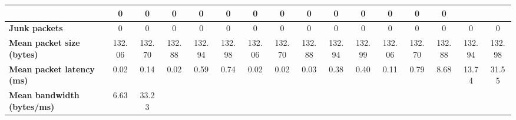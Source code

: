 \begin{table}[!h]
{\begin{tabular}{|l|ccccc|ccccc|ccccc|}
            & \multicolumn{1}{c|}{0}
            & \multicolumn{1}{c|}{0}
            & \multicolumn{1}{c|}{0}
            & \multicolumn{1}{c|}{0}
            & \multicolumn{1}{c|}{0}
            & \multicolumn{1}{c|}{0}
            & \multicolumn{1}{c|}{0}
            & \multicolumn{1}{c|}{0}
            & \multicolumn{1}{c|}{0}
            & \multicolumn{1}{c|}{0}
            & \multicolumn{1}{c|}{0}
            & \multicolumn{1}{c|}{0}
            & \multicolumn{1}{c|}{0}
            \\ \hline
            \textbf{Junk packets} & \multicolumn{1}{c|}{0} & \multicolumn{1}{c|}{0} & \multicolumn{1}{c|}{0}
            & \multicolumn{1}{c|}{0}
            & \multicolumn{1}{c|}{0}
            & \multicolumn{1}{c|}{0}
            & \multicolumn{1}{c|}{0}
            & \multicolumn{1}{c|}{0}
            & \multicolumn{1}{c|}{0}
            & \multicolumn{1}{c|}{0}
            & \multicolumn{1}{c|}{0}
            & \multicolumn{1}{c|}{0}
            & \multicolumn{1}{c|}{0}
            & \multicolumn{1}{c|}{0}
            & \multicolumn{1}{c|}{0}
            \\ \hline
            \textbf{Mean packet size (bytes)} & \multicolumn{1}{c|}{132.06} & \multicolumn{1}{c|}{132.70}
            & \multicolumn{1}{c|}{132.88}
            & \multicolumn{1}{c|}{132.94}
            & \multicolumn{1}{c|}{132.98}
            & \multicolumn{1}{c|}{132.06}
            & \multicolumn{1}{c|}{132.70}
            & \multicolumn{1}{c|}{132.88}
            & \multicolumn{1}{c|}{132.94}
            & \multicolumn{1}{c|}{132.99}
            & \multicolumn{1}{c|}{132.06}
            & \multicolumn{1}{c|}{132.70}
            & \multicolumn{1}{c|}{132.88}
            & \multicolumn{1}{c|}{132.94}
            & \multicolumn{1}{c|}{132.98}
            \\ \hline
            \textbf{Mean packet latency (ms)} & \multicolumn{1}{c|}{0.02} & \multicolumn{1}{c|}{0.14}
            & \multicolumn{1}{c|}{0.02}
            & \multicolumn{1}{c|}{0.59}
            & \multicolumn{1}{c|}{0.74}
            & \multicolumn{1}{c|}{0.02}
            & \multicolumn{1}{c|}{0.02}
            & \multicolumn{1}{c|}{0.03}
            & \multicolumn{1}{c|}{0.38}
            & \multicolumn{1}{c|}{0.40}
            & \multicolumn{1}{c|}{0.11}
            & \multicolumn{1}{c|}{0.79}
            & \multicolumn{1}{c|}{8.68}
            & \multicolumn{1}{c|}{13.74}
            & \multicolumn{1}{c|}{31.55}
            \\ \hline
            \textbf{Mean bandwidth (bytes/ms)} & \multicolumn{1}{c|}{6.63} & \multicolumn{1}{c|}{33.23}

\end{tabular}}
\end{table}

